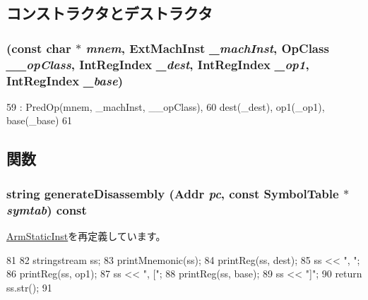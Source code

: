 \subsection{コンストラクタとデストラクタ}
\hypertarget{classArmISA_1_1Swap_ab97bac2c62be7d8b91f18b0ef20c7a63}{
\subsubsection[{Swap}]{ (const char $\ast$ {\em mnem}, \/  {\bf ExtMachInst} {\em \_\-machInst}, \/  OpClass {\em \_\-\_\-opClass}, \/  {\bf IntRegIndex} {\em \_\-dest}, \/  {\bf IntRegIndex} {\em \_\-op1}, \/  {\bf IntRegIndex} {\em \_\-base})}}
\label{classArmISA_1_1Swap_ab97bac2c62be7d8b91f18b0ef20c7a63}



\begin{DoxyCode}
59         : PredOp(mnem, _machInst, __opClass),
60           dest(_dest), op1(_op1), base(_base)
61     {}
\end{DoxyCode}


\subsection{関数}
\hypertarget{classArmISA_1_1Swap_a3134956ec18bb095818e06eb988f6c55}{
\subsubsection[{generateDisassembly}]{\setlength{\rightskip}{0pt plus 5cm}string generateDisassembly ({\bf Addr} {\em pc}, \/  const SymbolTable $\ast$ {\em symtab}) const}}
\label{classArmISA_1_1Swap_a3134956ec18bb095818e06eb988f6c55}


\hyperlink{classArmISA_1_1ArmStaticInst_a95d323a22a5f07e14d6b4c9385a91896}{ArmStaticInst}を再定義しています。


\begin{DoxyCode}
81 {
82     stringstream ss;
83     printMnemonic(ss);
84     printReg(ss, dest);
85     ss << ", ";
86     printReg(ss, op1);
87     ss << ", [";
88     printReg(ss, base);
89     ss << "]";
90     return ss.str();
91 }
\end{DoxyCode}


